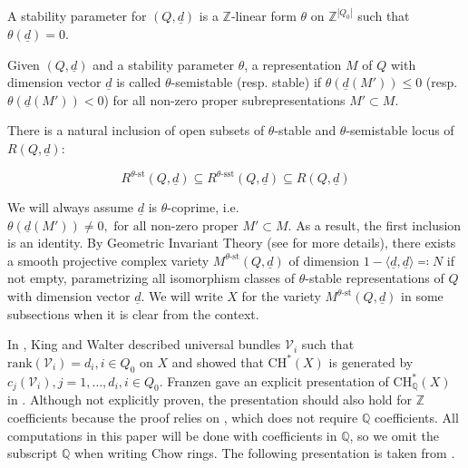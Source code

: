 \documentclass[11pt]{article}
\begin{document}
A stability parameter for \((Q, \underline{d})\) is a \(\mathbb{Z}\)-linear form \(\theta\) on \(\mathbb{Z}^{|Q_0|}\) such that \(\theta(\underline{d}) = 0\). 

\begin{definition}
    Given \((Q, \underline{d})\) and a stability parameter \(\theta\), a representation \(M\) of \(Q\) with dimension vector \(\underline{d}\) is called \(\theta\)-semistable (resp. stable) if \(\theta (\underline{d}(M')) \leq 0\) (resp. \(\theta(\underline{d}(M')) < 0\)) for all non-zero proper subrepresentations \(M'\subset M\).
\end{definition}

There is a natural inclusion of open subsets of \(\theta\)-stable and \(\theta\)-semistable locus of \(R(Q, \underline{d})\):

\[
R^{\theta\text{-st}}(Q, \underline{d})\subseteq R^{\theta\text{-sst}}(Q, \underline{d})\subseteq R(Q, \underline{d})
\]

We will always assume \(\underline{d}\) is \(\theta\)-coprime, i.e. \(\theta(\underline{d}(M'))\neq 0, \text{ for all non-zero proper } M'\subset M\). As a result, the first inclusion is an identity. By Geometric Invariant Theory (see \cite[Section 3.5]{Reineke08mo} for more details), there exists a smooth projective complex variety \(M^{\theta\text{-st}}(Q, \underline{d})\) of dimension \(1 - \langle \underline{d}, \underline{d}\rangle\eqqcolon N\) if not empty, parametrizing all isomorphism classes of \(\theta\)-stable representations of \(Q\) with dimension vector \(\underline{d}\). 
We will write \(X\) for the variety \(M^{\theta\text{-st}}(Q, \underline{d})\) in some subsections when it is clear from the context. 

In \cite{kingwalter1995chow}, King and Walter described universal bundles \(\mathcal{V}_i\) such that \(\mathrm{rank} (\mathcal{V}_i)=d_i, i\in Q_0\) on \(X\) and showed that \(\mathrm{CH}^*(X)\) is generated by \(c_j(\mathcal{V}_i), j = 1, \dots, d_i, i\in Q_0\). Franzen gave an explicit presentation of \(\mathrm{CH}_{\mathbb{Q}}^*(X)\) in \cite[Proposition 14]{franzen2015chow}. Although not explicitly proven, the presentation should also hold for \(\mathbb{Z}\) coefficients because the proof relies on \cite[Theorem 10.8]{DanilovToric78}, which does not require \(\mathbb{Q}\) coefficients. All computations in this paper will be done with coefficients in \(\mathbb{Q}\), so we omit the subscript \(\mathbb{Q}\) when writing Chow rings. The following presentation is taken from \cite[Section 2]{belmans2024chow}. 
\end{document}
